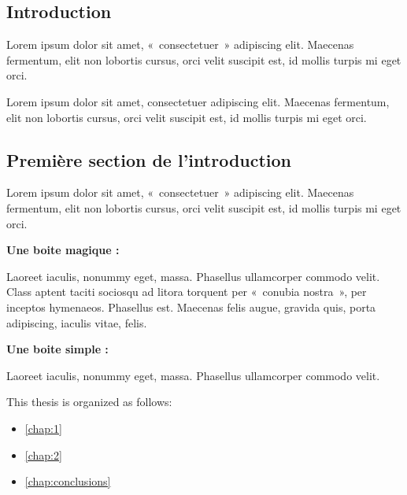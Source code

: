 \begin{bibunit}

\chapter*{Introduction}

Lorem ipsum dolor sit amet, «~consectetuer~» adipiscing elit. Maecenas fermentum, elit non lobortis cursus, orci velit suscipit est, id mollis turpis mi eget orci.

Lorem ipsum dolor sit amet, consectetuer adipiscing elit. Maecenas fermentum, elit non lobortis cursus, orci velit suscipit est, id mollis turpis mi eget orci.

\section*{Première section de l'introduction}

Lorem ipsum dolor sit amet, «~consectetuer~» adipiscing elit. Maecenas fermentum, elit non lobortis cursus, orci velit suscipit est, id mollis turpis mi eget orci.

\textbf{Une boite magique : }


Laoreet iaculis, nonummy eget, massa. Phasellus ullamcorper commodo velit. Class aptent taciti sociosqu ad litora torquent per «~conubia nostra~», per inceptos hymenaeos. Phasellus est. Maecenas felis augue, gravida quis, porta adipiscing, iaculis vitae, felis.

\textbf{Une boite simple : }

Laoreet iaculis, nonummy eget, massa. Phasellus ullamcorper commodo velit.

This thesis is organized as follows:

\begin{itemize}
    \item \autoref{chap:1}
    \item \autoref{chap:2}
    \item \autoref{chap:conclusions}
\end{itemize}


\end{bibunit}
